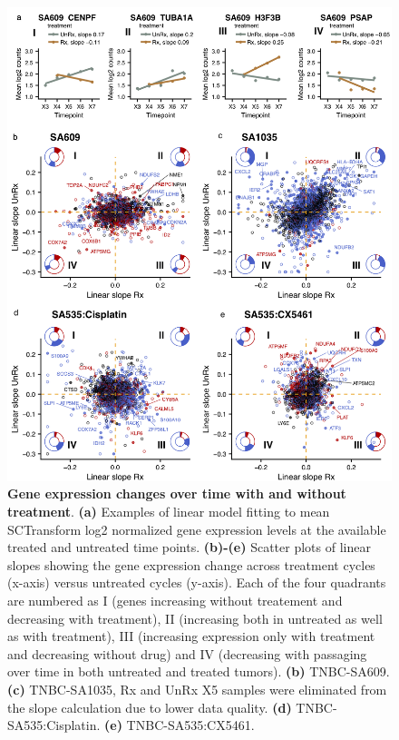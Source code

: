 \begin{figure}
\centering
 \includegraphics[width=\textwidth]{Figures/chap5/fig15_GeneschanginginRxclouds.png}
\caption[Gene expression changes over time with and without treatment in all 4 TNBC PDX timeseries]
	{\small
	 \textbf{Gene expression changes over time with and without treatment}.
\textbf{(a)} Examples of linear model fitting to mean SCTransform log2 normalized gene expression levels at the available treated and untreated time points. \textbf{(b)-(e)} Scatter plots of linear slopes showing the gene expression change across treatment cycles (x-axis) versus untreated cycles (y-axis). Each of the four quadrants are numbered as I (genes increasing without treatement and decreasing with treatment), II (increasing both in untreated as well as with treatment), III (increasing expression only with treatment and decreasing without drug) and  IV (decreasing with passaging over time in both untreated and treated tumors).  \textbf{(b)} TNBC-SA609. \textbf{(c)} TNBC-SA1035, Rx and UnRx X5 samples were eliminated from the slope calculation due to lower data quality. \textbf{(d)} TNBC-SA535:Cisplatin. \textbf{(e)} TNBC-SA535:CX5461.}

	\label{fig:GeneschanginginRxclouds}
\end{figure}

